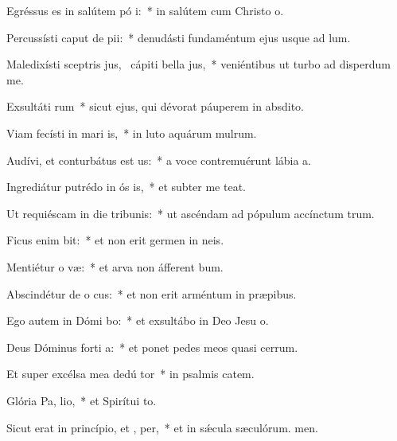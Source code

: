 \item Egréssus es in salútem pó i:~* in salútem cum Christo o.
\item Percussísti caput de  pii:~* denudásti fundaméntum ejus usque ad lum.
\item Maledixísti sceptris jus,~\pscross{} cápiti bella jus,~* veniéntibus ut turbo ad disperdum me.
\item Exsultáti rum~* sicut ejus, qui dévorat páuperem in absdito.
\item Viam fecísti in mari  is,~* in luto aquárum mulrum.
\item Audívi, et conturbátus est  us:~* a voce contremuérunt lábia a.
\item Ingrediátur putrédo in ós is,~* et subter me teat.
\item Ut requiéscam in die tribunis:~* ut ascéndam ad pópulum accínctum trum.
\item Ficus enim  bit:~* et non erit germen in neis.
\item Mentiétur o væ:~* et arva non áfferent bum.
\item Abscindétur de o cus:~* et non erit arméntum in præpibus.
\item Ego autem in Dómi bo:~* et exsultábo in Deo Jesu o.
\item Deus Dóminus forti a:~* et ponet pedes meos quasi cerrum.
\item Et super excélsa mea dedú  tor~* in psalmis catem.
\item Glória Pa,  lio,~* et Spirítui to.
\item Sicut erat in princípio, et ,  per,~* et in sǽcula sæculórum. men.
